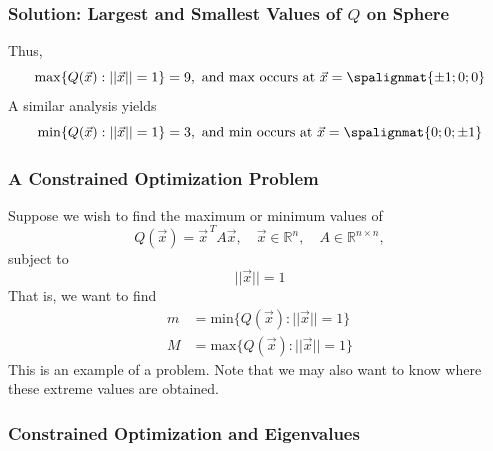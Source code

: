 \begin{frame}\frametitle{Solution: Largest and Smallest Values of $Q$ on Sphere}     
     {Thus, $$\mathrm{max} \{ Q(\vec x) : ||\vec x|| = 1\} = 9, \ \text{and max occurs at } \vec x = \spalignmat{\pm1;0;0}$$}
     {A similar analysis yields 
    $$\mathrm{min} \{ Q(\vec x) : ||\vec x|| = 1\} = 3, \ \text{and min occurs at } \vec x = \spalignmat{0;0;\pm1}$$}
\end{frame}


\begin{frame}\frametitle{A Constrained Optimization Problem}

    Suppose we wish to find the maximum or minimum values of $$Q(\vec x) = \vec x^{\, T}A \vec x, \quad \vec x \in \mathbb R^n, \quad A \in \mathbb R^{n\times n},$$ subject to $$||\vec x|| = 1$$ \pause That is, we want to find
    \begin{align*}
        m &= \mathrm{min} \{ Q(\vec x) : ||\vec x|| = 1 \} \\
        M &= \mathrm{max} \{ Q(\vec x) : ||\vec x|| = 1 \}
    \end{align*}
    \pause 
    This is an example of a  problem. Note that we may also want to know where these extreme values are obtained. 
    
\end{frame}


\begin{frame}\frametitle{Constrained Optimization and Eigenvalues}
    
    \begin{center}\end{center}
    

\end{frame}


